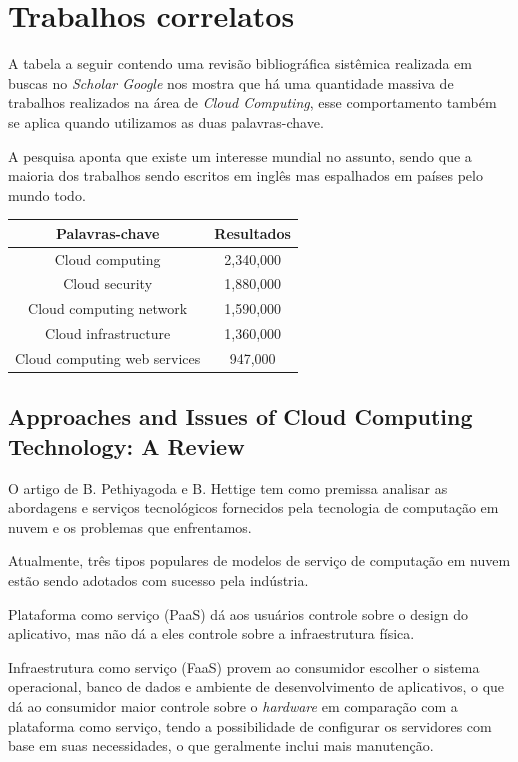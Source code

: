 \documentclass[12pt]{article}
\begin{document}
\section{Trabalhos correlatos}

A tabela a seguir contendo uma revisão bibliográfica sistêmica realizada em buscas no \emph{Scholar Google} nos mostra que há uma quantidade massiva de trabalhos realizados na área de \emph{Cloud Computing}, esse comportamento também se aplica quando utilizamos as duas palavras-chave.

A pesquisa aponta que existe um interesse mundial no assunto, sendo que a maioria dos trabalhos sendo escritos em inglês mas espalhados em países pelo mundo todo.

\begin{center}
    \begin{tabular}{ | c | c | }
    \hline
    Palavras-chave & Resultados \\ 
    \hline
    Cloud computing & 2,340,000 \\  
    \hline
    Cloud security & 1,880,000 \\
    \hline
    Cloud computing network & 1,590,000 \\
    \hline
    Cloud infrastructure & 1,360,000 \\
    \hline
    Cloud computing web services & 947,000 \\
    \hline
    \end{tabular}
\end{center}

\subsection{Approaches and Issues of Cloud Computing Technology: A Review \cite{pethi}}

O artigo de B. Pethiyagoda e B. Hettige tem como premissa analisar as abordagens e serviços tecnológicos fornecidos pela tecnologia de computação em nuvem e os problemas que enfrentamos.

Atualmente, três tipos populares de modelos de serviço de computação em nuvem estão sendo adotados com sucesso pela indústria. 

Plataforma como serviço (PaaS) dá aos usuários controle sobre o design do aplicativo, mas não dá a eles controle sobre a infraestrutura física. 

Infraestrutura como serviço (FaaS) provem ao consumidor escolher o sistema operacional, banco de dados e ambiente de desenvolvimento de aplicativos, o que dá ao consumidor maior controle sobre o \emph{hardware} em comparação com a plataforma como serviço, tendo a possibilidade de configurar os servidores com base em suas necessidades, o que geralmente inclui mais manutenção.
\end{document}
